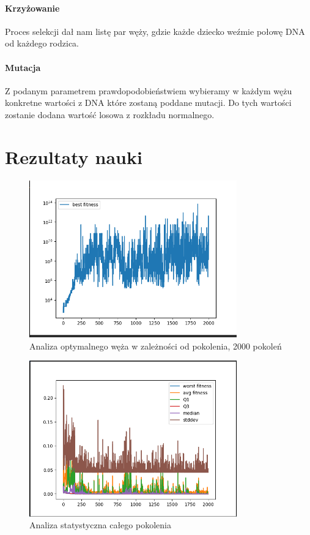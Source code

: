 \documentclass{article}
\begin{document}
\paragraph{Krzyżowanie}
Proces selekcji dał nam listę par węży, gdzie każde dziecko weźmie połowę DNA od każdego rodzica.
\paragraph{Mutacja}
Z podanym parametrem prawdopodobieństwiem  wybieramy w każdym wężu konkretne wartości z DNA które zostaną poddane mutacji.
Do tych wartości zostanie dodana wartość losowa z rozkładu normalnego.
\section{Rezultaty nauki}
\begin{figure}[H]
\includegraphics[width=0.8\textwidth]{bf}
\caption{Analiza optymalnego węża w zależności od pokolenia, 2000 pokoleń}
\end{figure}
\begin{figure}[H]
\includegraphics[width=0.8\textwidth]{stat}
\caption{Analiza statystyczna całego pokolenia}
\end{figure}
\end{document}
